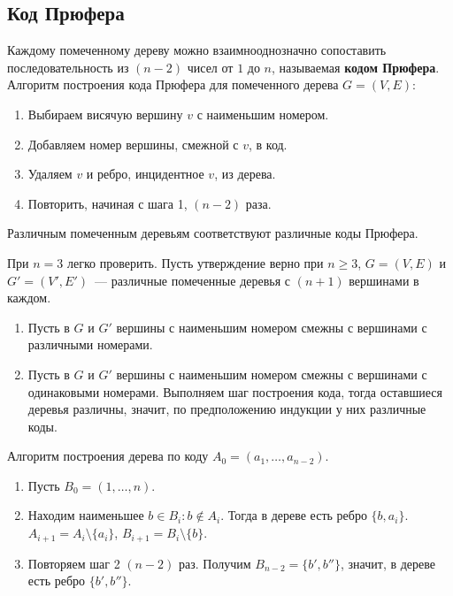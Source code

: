 \subsection{Код Прюфера}

Каждому помеченному дереву можно взаимнооднозначно сопоставить последовательность из $(n - 2)$ чисел от $1$ до $n$, называемая \textbf{кодом Прюфера}. Алгоритм построения кода Прюфера для помеченного дерева $G = (V, E)$:
\begin{enumerate}
	\item Выбираем висячую вершину $v$ с наименьшим номером.
	\item Добавляем номер вершины, смежной с $v$, в код.
	\item Удаляем $v$ и ребро, инцидентное $v$, из дерева.
	\item Повторить, начиная с шага 1, $(n - 2)$ раза.
\end{enumerate}

\begin{statement}
	Различным помеченным деревьям соответствуют различные коды Прюфера.
\end{statement}
\begin{proofmathind}
	\indbase При $n = 3$ легко проверить.
	\indstep Пусть утверждение верно при $n \geqslant 3$, $G = (V, E)$ и $G' = (V', E')$~--- различные помеченные деревья с $(n + 1)$ вершинами в каждом.
	\begin{enumerate}
		\item Пусть в $G$ и $G'$ вершины с наименьшим номером смежны с вершинами с различными номерами.
		\item Пусть в $G$ и $G'$ вершины с наименьшим номером смежны с вершинами с одинаковыми номерами. Выполняем шаг построения кода, тогда оставшиеся деревья различны, значит, по предположению индукции у них различные коды.
	\end{enumerate}
	\indend
\end{proofmathind}

	Алгоритм построения дерева по коду $A_0 = (a_1, \ldots, a_{n-2})$.
\begin{enumerate}
	\item Пусть $B_0 = (1, \ldots, n)$.
	\item Находим наименьшее $b \in B_i \colon b \notin A_i$. Тогда в дереве есть ребро $\{ b, a_i \}$. $A_{i+1} = A_i \setminus \{ a_i \}$, $B_{i+1} = B_i \setminus \{ b \}$.
	\item Повторяем шаг 2 $(n - 2)$ раз. Получим $B_{n-2} = \{ b', b'' \}$, значит, в дереве есть ребро $\{ b', b'' \}$.
\end{enumerate}

